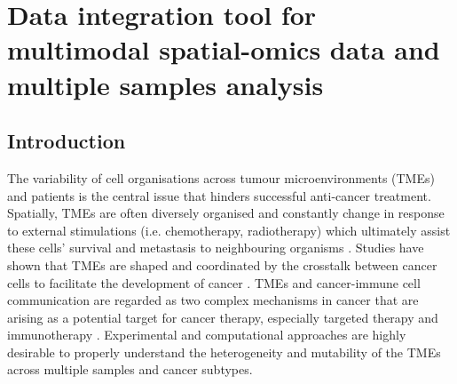 \chapter[Data integration tool for multimodal spatial-omics data and multiple samples analysis]{Data integration tool for multimodal spatial-omics data and multiple samples analysis}
\label{Chap:4}	%
\pagestyle{headings}
\label{Sec:4.1_intro}	%
\section{Introduction}
The variability of cell organisations across tumour microenvironments (TMEs) and patients is the central issue that hinders successful anti-cancer treatment. Spatially, TMEs are often diversely organised and constantly change in response to external stimulations (i.e. chemotherapy, radiotherapy) which ultimately assist these cells’ survival and metastasis to neighbouring organisms \cite{wu2022spatial}. Studies have shown that TMEs are shaped and coordinated by the crosstalk between cancer cells to facilitate the development of cancer \cite{jin2020updated, quail2013microenvironmental, schurch2020coordinated}. TMEs and cancer-immune cell communication are regarded as two complex mechanisms in cancer that are arising as a potential target for cancer therapy, especially targeted therapy and immunotherapy \cite{jin2020updated, abou2020integrating, qiu2017reprogramming}. Experimental and computational approaches are highly desirable to properly understand the heterogeneity and mutability of the TMEs across multiple samples and cancer subtypes. 

